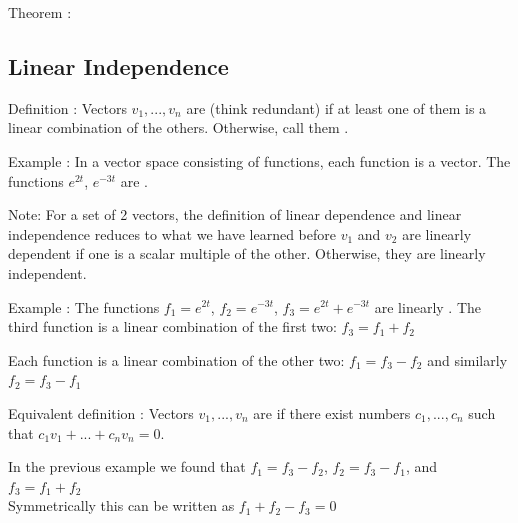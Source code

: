 \documentclass[11pt, openright]{book}
\begin{document}
\begin{dent}{Theorem :}
\end{dent}

\subsection{Linear Independence}

\begin{dent}{Definition :}
    Vectors $v_1,...,v_n$ are  (think redundant) if at least one of them is a linear combination of the others. Otherwise, call them .
\end{dent}

\begin{dent}{Example :}
    In a vector space consisting of functions, each function is a vector. The functions $e^{2t}$, $e^{-3t}$ are .
\end{dent}\vspace{-35pt}

\begin{dent}{}

    Note: For a set of 2 vectors, the definition of linear dependence and linear independence reduces to what we have learned
    before $v_1$ and $v_2$ are linearly dependent if one is a scalar multiple of the other. Otherwise, they are linearly independent.
\end{dent}

\begin{dent}{Example :}
    The functions $f_1=e^{2t}$, $f_2=e^{-3t}$, $f_3=e^{2t}+e^{-3t}$ are linearly . The third function is a linear combination of the first two: $f_3=f_1+f_2$

    Each function is a linear combination of the other two: $f_1=f_3-f_2$ and similarly $f_2=f_3-f_1$
\end{dent}

\begin{dent}{Equivalent definition :}
    Vectors $v_1,...,v_n$ are  if there exist numbers $c_1,...,c_n$  such that $c_1v_1+...+c_nv_n=0$.

    In the previous example we found that $f_1=f_3-f_2$, $f_2=f_3-f_1$, and $f_3=f_1+f_2$\\
    Symmetrically this can be written as $f_1+f_2-f_3=0$
\end{dent}
\end{document}
